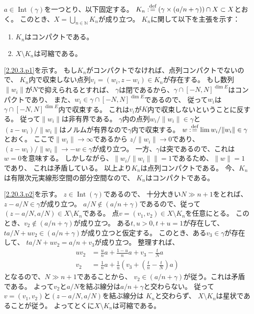 \documentclass[uplatex,dvipdfmx]{jsarticle}
\makeatletter
\theoremstyle{definition}
\renewenvironment{proof}[1][\proofname]{
  \pushQED{\qed}%
  \normalfont \topsep6\p@\@plus6\p@\relax
  \trivlist
  \item[\hskip\labelsep
    #1\@addpunct{\textbf{.}}]\ignorespaces
}{%
  \popQED\endtrivlist\@endpefalse
}
\providecommand{\proofname}{証明}
\DeclareMathOperator{\Int}{\mathrm{Int}}
\newcommand\N{\mathbb{N}}
\def\dfn{:\overset{\mbox{{\scriptsize def}}}{=}}
\makeatother
\begin{document}
\begin{proof}
  \(a\in \Int(\gamma)\)を一つとり、以下固定する。
  \(K_n \dfn (\gamma \times (a/n + \gamma)) \cap X \subset X\)とおく。
  このとき、\(X = \bigcup_{n\in \N}K_n\)が成り立つ。
  \(K_n\)に関して以下を主張を示す：
  \begin{enumerate}[label=(\fnsymbol*),start=2]
    \item \label{2.20.3.p1}
    \(K_n\)はコンパクトである。
    \item \label{2.20.3.p2}
    \(X\setminus K_n\)は可縮である。
  \end{enumerate}
  \ref{2.20.3.p1}を示す。
  もし\(K_n\)がコンパクトでなければ、点列コンパクトでないので、
  \(K_n\)内で収束しない点列\(v_i = (w_i,z-w_i)\in K_n\)が存在する。
  もし数列\(\| w_i\|\)が\(N\)で抑えられるとすれば、
  \(\gamma\)は閉であるから、\(\gamma\cap [-N,N]^{\dim E}\)はコンパクトであり、
  また、\(w_i\in \gamma\cap [-N,N]^{\dim E}\)であるので、
  従って\(w_i\)は\(\gamma\cap [-N,N]^{\dim E}\)内で収束する。
  これは\(v_i\)が\(K\)内で収束しないということに反する。
  従って\(\| w_i\|\)は非有界である。
  \(\gamma\)内の点列\(w_i/\|w_i\|\in \gamma\)と
  \((z-w_i)/\|w_i\|\)はノルムが有界なので\(\gamma\)内で収束する。
  \(w \dfn \lim w_i/\|w_i\|\in \gamma\)とおく。
  ここで\(\|w_i\| \to \infty\)であるから
  \(z/\|w_i\|\to 0\)であり、
  \((z-w_i)/\|w_i\| \to -w\in \gamma\)が成り立つ。
  一方、\(\gamma\)は突であるので、これは\(w = 0\)を意味する。
  しかしながら、\(\|w_i/\|w_i\|\| = 1\)であるため、\(\|w\|=1\)であり、
  これは矛盾している。
  以上より\(K_n\)は点列コンパクトである。
  今、\(K_n\)は有限次元実線形空間の部分空間なので、
  \(K_n\)はコンパクトである。

  \ref{2.20.3.p2}を示す。
  \(z\in \Int(\gamma)\)であるので、
  十分大きい\(N\gg n+1\)をとれば、
  \(z-a/N\in \gamma\)が成り立つ。
  \(a/N\not\in (a/n+\gamma)\)であるので、従って
  \((z-a/N,a/N)\in X\setminus K_n\)である。
  点\(v = (v_1,v_2)\in X\setminus K_n\)を任意にとる。
  このとき、\(v_2\not\in (a/n+\gamma)\)が成り立つ。
  ある\(t,u>0, t+u = 1\)が存在して、
  \(ta/N + uv_2 \in (a/n+\gamma)\)が成り立つと仮定する。
  このとき、ある\(v_3\in \gamma\)が存在して、
  \(ta/N + uv_2 = a/n + v_3\)が成り立つ。
  整理すれば、
  \begin{align*}
    uv_2 &= \frac{u}{n}a + \frac{1-u}{n}a + v_3 - \frac{t}{N}a \\
    v_2 &= \frac{1}{n}a + \frac{1}{u}\left( v_3 +
    \left(\frac{t}{n} - \frac{t}{N}\right)a \right)
  \end{align*}
  となるので、\(N \gg n+1\)であることから、
  \(v_2\in (a/n + \gamma)\)が従う。これは矛盾である。
  よって\(v_2\)と\(a/N\)を結ぶ線分は\(a/n+\gamma\)と交わらない。
  従って\(v=(v_1,v_2)\)と\((z-a/N,a/N)\)を結ぶ線分は
  \(K_n\)と交わらず、
  \(X\setminus K_n\)は星状であることが従う。
  よってとくに\(X\setminus K_n\)は可縮である。


\end{proof}
\end{document}
